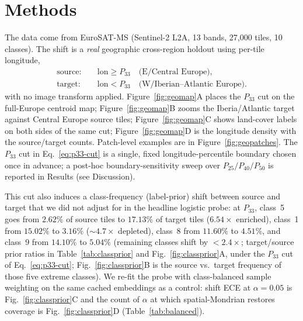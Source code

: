 \documentclass[preprint,11pt,authoryear]{elsarticle}
\begin{document}
\section{Methods}\label{sec:methods}
The data come from EuroSAT-MS \citep{helber2019eurosat} (Sentinel-2 L2A, 13 bands, 27{,}000 tiles, 10 classes). The shift is a
\emph{real} geographic cross-region holdout using per-tile longitude,
\begin{equation}
\label{eq:p33-cut}
\begin{aligned}
\mathrm{source}:&\quad \mathrm{lon}\ge P_{33}
\quad\text{(E/Central Europe)},\\
\mathrm{target}:&\quad \mathrm{lon}< P_{33}
\quad\text{(W/Iberian--Atlantic Europe)}.
\end{aligned}
\end{equation}
with no image transform applied. Figure~\ref{fig:geomap}A places the $P_{33}$ cut on the full-Europe
centroid map; Figure~\ref{fig:geomap}B zooms the Iberia/Atlantic target against Central Europe source
tiles; Figure~\ref{fig:geomap}C shows land-cover labels on both sides of the same cut; Figure~\ref{fig:geomap}D
is the longitude density with the source/target counts. Patch-level examples are in
Figure~\ref{fig:geopatches}. The $P_{33}$ cut in Eq.~\eqref{eq:p33-cut} is a single, fixed longitude-percentile
boundary chosen once in advance; a post-hoc boundary-sensitivity sweep over $P_{25}/P_{40}/P_{50}$ is
reported in Results (see Discussion).

This cut also induces a class-frequency (label-prior) shift
between source and target that we did not adjust for in the headline logistic probe: at $P_{33}$, class~5
goes from $2.62\%$ of source tiles to $17.13\%$ of target tiles ($6.54\times$ enriched), class~1 from
$15.02\%$ to $3.16\%$ ($\sim\!4.7\times$ depleted), class~8 from $11.60\%$ to $4.51\%$, and class~9 from
$14.10\%$ to $5.04\%$ (remaining classes shift by ${<}2.4\times$; target/source prior ratios in
Table~\ref{tab:classprior} and Fig.~\ref{fig:classprior}A, under the $P_{33}$ cut of
Eq.~\eqref{eq:p33-cut}; Fig.~\ref{fig:classprior}B is the source vs.\ target frequency of those
five extreme classes). We
re-fit the probe with class-balanced sample weighting on the same cached embeddings as a control:
shift ECE at $\alpha{=}0.05$ is Fig.~\ref{fig:classprior}C and the count of $\alpha$ at which
spatial-Mondrian restores coverage is Fig.~\ref{fig:classprior}D (Table~\ref{tab:balanced}).
\end{document}
